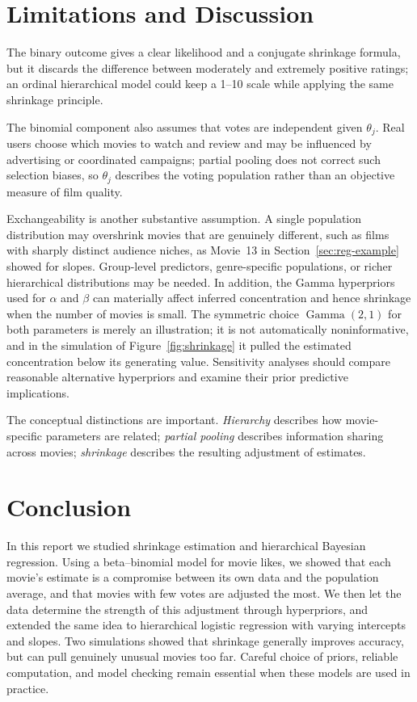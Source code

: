 \documentclass[11pt,a4paper]{article}
\newcommand{\Gam}{\operatorname{Gamma}}
\begin{document}
\section{Limitations and Discussion}
\label{sec:limitations}
The binary outcome gives a clear likelihood and a conjugate shrinkage formula, but it discards the difference between moderately and extremely positive ratings; an ordinal hierarchical model could keep a 1--10 scale while applying the same shrinkage principle.

The binomial component also assumes that votes are independent given $\theta_j$. Real users choose which movies to watch and review and may be influenced by advertising or coordinated campaigns; partial pooling does not correct such selection biases, so $\theta_j$ describes the voting population rather than an objective measure of film quality.

Exchangeability is another substantive assumption. A single population distribution may overshrink movies that are genuinely different, such as films with sharply distinct audience niches, as Movie~13 in Section~\ref{sec:reg-example} showed for slopes. Group-level predictors, genre-specific populations, or richer hierarchical distributions may be needed. In addition, the Gamma hyperpriors used for $\alpha$ and $\beta$ can materially affect inferred concentration and hence shrinkage when the number of movies is small. The symmetric choice $\Gam(2,1)$ for both parameters is merely an illustration; it is not automatically noninformative, and in the simulation of Figure~\ref{fig:shrinkage} it pulled the estimated concentration below its generating value. Sensitivity analyses should compare reasonable alternative hyperpriors and examine their prior predictive implications.

The conceptual distinctions are important. \emph{Hierarchy} describes how movie-specific parameters are related; \emph{partial pooling} describes information sharing across movies; \emph{shrinkage} describes the resulting adjustment of estimates.

\section{Conclusion}
In this report we studied shrinkage estimation and hierarchical Bayesian regression. Using a beta--binomial model for movie likes, we showed that each movie's estimate is a compromise between its own data and the population average, and that movies with few votes are adjusted the most. We then let the data determine the strength of this adjustment through hyperpriors, and extended the same idea to hierarchical logistic regression with varying intercepts and slopes. Two simulations showed that shrinkage generally improves accuracy, but can pull genuinely unusual movies too far. Careful choice of priors, reliable computation, and model checking remain essential when these models are used in practice.
\end{document}
